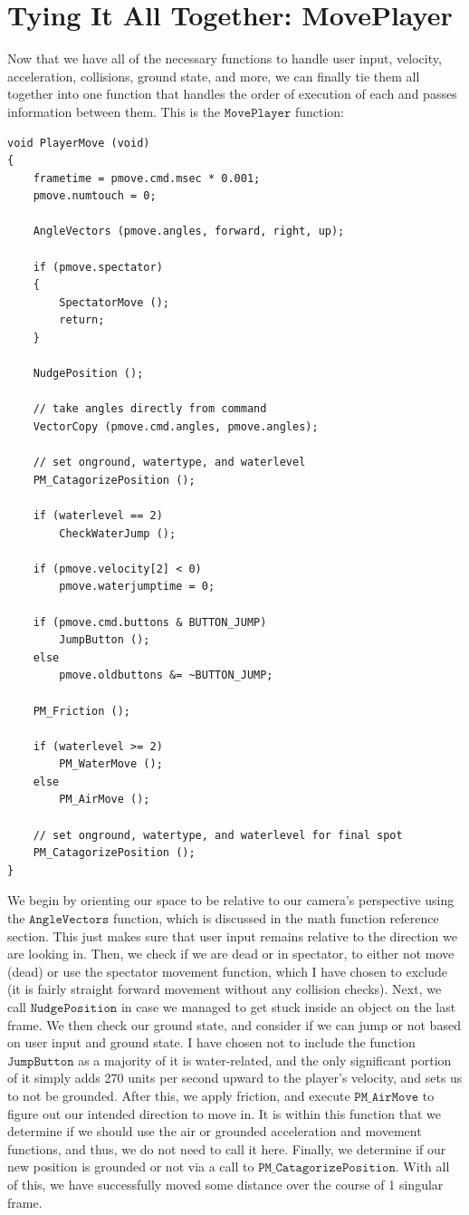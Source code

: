 \documentclass{article}
\begin{document}
\section{Tying It All Together: MovePlayer}
Now that we have all of the necessary functions to handle user input, velocity, acceleration, collisions, ground state, and more, we can finally tie them all together into one function that handles the order of execution of each and passes information between them. This is the $\texttt{MovePlayer}$ function:
\begin{verbatim}
void PlayerMove (void)
{
	frametime = pmove.cmd.msec * 0.001;
	pmove.numtouch = 0;

	AngleVectors (pmove.angles, forward, right, up);

	if (pmove.spectator)
	{
		SpectatorMove ();
		return;
	}

	NudgePosition ();

	// take angles directly from command
	VectorCopy (pmove.cmd.angles, pmove.angles);

	// set onground, watertype, and waterlevel
	PM_CatagorizePosition ();

	if (waterlevel == 2)
		CheckWaterJump ();

	if (pmove.velocity[2] < 0)
		pmove.waterjumptime = 0;

	if (pmove.cmd.buttons & BUTTON_JUMP)
		JumpButton ();
	else
		pmove.oldbuttons &= ~BUTTON_JUMP;

	PM_Friction ();

	if (waterlevel >= 2)
		PM_WaterMove ();
	else
		PM_AirMove ();

	// set onground, watertype, and waterlevel for final spot
	PM_CatagorizePosition ();
}
\end{verbatim}
We begin by orienting our space to be relative to our camera's perspective using the $\texttt{AngleVectors}$ function, which is discussed in the math function reference section. This just makes sure that user input remains relative to the direction we are looking in. Then, we check if we are dead or in spectator, to either not move (dead) or use the spectator movement function, which I have chosen to exclude (it is fairly straight forward movement without any collision checks). Next, we call $\texttt{NudgePosition}$ in case we managed to get stuck inside an object on the last frame. We then check our ground state, and consider if we can jump or not based on user input and ground state. I have chosen not to include the function $\texttt{JumpButton}$ as a majority of it is water-related, and the only significant portion of it simply adds 270 units per second upward to the player's velocity, and sets us to not be grounded. After this, we apply friction, and execute $\texttt{PM\_AirMove}$ to figure out our intended direction to move in. It is within this function that we determine if we should use the air or grounded acceleration and movement functions, and thus, we do not need to call it here. Finally, we determine if our new position is grounded or not via a call to $\texttt{PM\_CatagorizePosition}$. With all of this, we have successfully moved some distance over the course of 1 singular frame.
\end{document}
